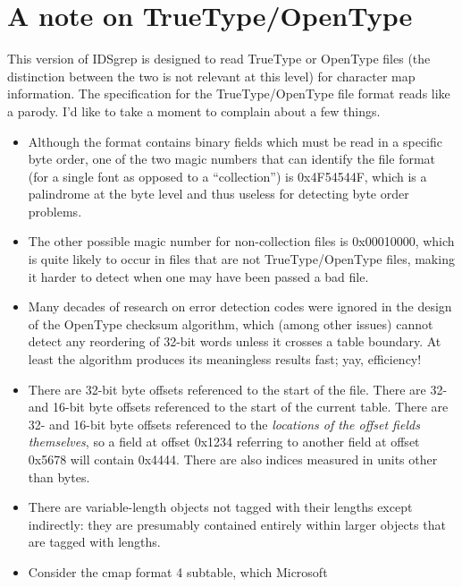 \documentclass[twocolumn]{report}
\newcommand{\DangerousSection}{\marginpar{\large\hfill
\raisebox{-0.5\baselineskip}[0pt][0pt]{\dbend}\hfill\null}}
\begin{document}

\section{A note on TrueType/OpenType}\DangerousSection

This version of IDSgrep is designed to read TrueType or
OpenType files (the distinction between the two is not relevant at this
level) for character map information.  The specification for the
TrueType/OpenType file format reads like a parody.  I'd like to take a
moment to complain about a few things.

\begin{itemize}
  \item Although the format contains binary fields which must be read
    in a specific byte order, one of the two magic numbers that can
    identify the file format (for a single font as opposed to a
    ``collection'') is 0x4F54544F, which is a palindrome at the byte
    level and thus useless for detecting byte order problems.
  \item The other possible magic number for non-collection files
    is 0x00010000, which is quite likely to occur in files that are
    not TrueType/OpenType files, making it harder to detect when one
    may have been passed a bad file.
  \item Many decades of research on error detection codes were ignored
    in the design of the OpenType checksum algorithm, which (among
    other issues) cannot detect any reordering of 32-bit words unless
    it crosses a table boundary.  At least the algorithm produces its
    meaningless results fast; yay, efficiency!
  \item There are 32-bit byte offsets referenced to the start of the file.
    There are 32- and 16-bit byte offsets referenced to the start of
    the current table.  There are 32- and 16-bit byte offsets
    referenced to the \emph{locations of the offset fields themselves}, so a
    field at offset 0x1234 referring to another field at offset 0x5678
    will contain 0x4444.  There are also indices measured in units
    other than bytes.
  \item There are variable-length objects not tagged
    with their lengths except indirectly: they are presumably
    contained entirely within larger objects that are tagged with lengths.
  \item Consider the cmap format 4 subtable, which Microsoft

\end{itemize}
\end{document}
